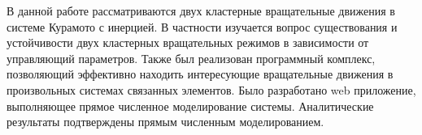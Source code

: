 В данной работе рассматриваются двух кластерные вращательные движения в системе Курамото с инерцией. 
В частности изучается вопрос существования и устойчивости двух кластерных вращательных режимов в зависимости от управляющий параметров.
Также был реализован программный комплекс, позволяющий эффективно находить интересующие вращательные
движения в произвольных системах связанных элементов.
Было разработано web приложение, выполняющее прямое численное моделирование системы.
Аналитические результаты подтверждены прямым численным моделированием.
